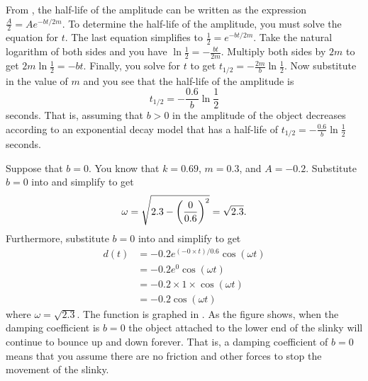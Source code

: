 \documentclass[a4paper,oneside,12pt]{article}
\begin{document}
\begin{problem}
{\begin{solution}
From , the half-life of
the amplitude can be written as the expression
$\frac{A}{2} = A e^{-bt / 2m}$.  To determine the half-life of the
amplitude, you must solve the equation for $t$.  The last equation
simplifies to $\frac{1}{2} = e^{-bt / 2m}$.  Take the natural
logarithm of both sides and you have
$\ln\frac{1}{2} = -\frac{bt}{2m}$.  Multiply both sides by $2m$ to get
$2m \ln\frac{1}{2} = -bt$.  Finally, you solve for $t$ to get
$t_{1/2} = -\frac{2m}{b} \ln\frac{1}{2}$.  Now substitute in the value
of $m$ and you see that the half-life of the amplitude is
\begin{equation}
\label{eqn:trigonometric:damped_amplitude_halflife}
t_{1/2}
=
-\frac{0.6}{b} \ln\frac{1}{2}
\end{equation}
seconds.  That is, assuming that $b > 0$ in
 the amplitude of the
object decreases according to an exponential decay model that has a
half-life of $t_{1/2} = -\frac{0.6}{b} \ln\frac{1}{2}$ seconds.

Suppose that $b = 0$.  You know that $k = 0.69$, $m = 0.3$, and
$A = -0.2$.  Substitute $b = 0$ into
 and simplify to
get
\[
\omega
=
\sqrt{
  2.3
  -
  \parenthesis*{\frac{0}{0.6}}^2
}
=
\sqrt{2.3}.
\]
Furthermore, substitute $b = 0$ into
 and simplify to
get
\begin{equation}
\label{eqn:trigonometric:damped_b_zero}
\begin{aligned}
d(t)
&=
-0.2 e^{(-0 \times t) / 0.6} \cos(\omega t) \\[4pt]
&=
-0.2 e^0 \cos(\omega t) \\[4pt]
&=
-0.2 \times 1 \times \cos(\omega t) \\[4pt]
&=
-0.2 \cos(\omega t)
\end{aligned}
\end{equation}
where $\omega = \sqrt{2.3}$.  The function is graphed in
.  As the figure shows,
when the damping coefficient is $b = 0$ the object attached to the
lower end of the slinky will continue to bounce up and down forever.
That is, a damping coefficient of $b = 0$ means that you assume there
are no friction and other forces to stop the movement of the slinky.


\end{solution}}
\end{problem}
\end{document}
